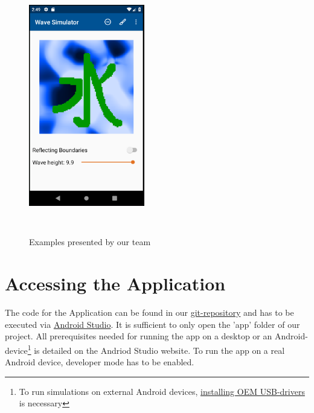 \documentclass[11pt,a4paper]{article}
\begin{document}
\begin{figure}[H]
{\hfill    
\includegraphics[width=0.45\textwidth , height = 10.5cm]{Mizu.png}%
}
\caption{Examples presented by our team}
\end{figure}

\pagebreak
\section{Accessing the Application}
The code for the Application can be found in our \href{https://gitlab.lrz.de/ga84niv/WaveSimulator.git}{git-repository} and has to be executed via \href{https://developer.android.com/studio/}{Android Studio}. It is sufficient to only open the 'app' folder of our project. All prerequisites needed for running the app on a desktop or an Android-device\footnote{To run simulations on external Android devices, \href{https://developer.android.com/studio/run/oem-usb}{installing OEM USB-drivers} is necessary} is detailed on the Andriod Studio website. To run the app on a real Android device, developer mode has to be enabled.
\end{document}
